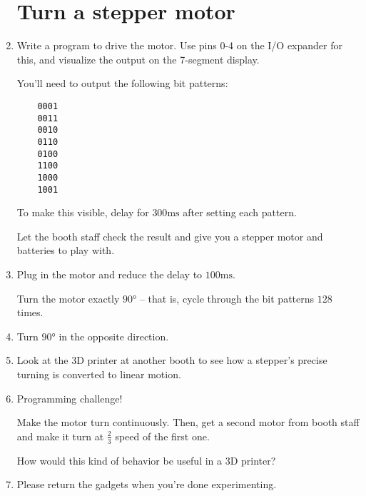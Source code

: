 \documentclass{../tutorial}
\begin{document}
\begin{enumerate}
\section{Turn a stepper motor}

\item
    Write a program to drive the motor.
    Use pins 0-4 on the I/O expander for this, and visualize the output
    on the 7-segment display.

    You'll need to output the following bit patterns:

    \begin{lstlisting}
    0001
    0011
    0010
    0110
    0100
    1100
    1000
    1001
    \end{lstlisting}

    To make this visible, delay for $300 \si{\milli\second}$ after setting each
    pattern.

    Let the booth staff check the result and give you a stepper motor and
    batteries to play with.

\item
    Plug in the motor and reduce the delay to $100 \si{\milli\second}$.

    Turn the motor exactly $90 \si{\degree}$ – that is, cycle through the bit
    patterns $128$ times.

\item
    Turn $90 \si{\degree}$ in the opposite direction.

\item
    Look at the 3D printer at another booth to see how a stepper's precise
    turning is converted to linear motion.

\item
    Programming challenge!

    Make the motor turn continuously.
    Then, get a second motor from booth staff and make it turn at $\frac23$
    speed of the first one.

    How would this kind of behavior be useful in a 3D printer?

\item
     Please return the gadgets when you're done experimenting.

\end{enumerate}
\end{document}
